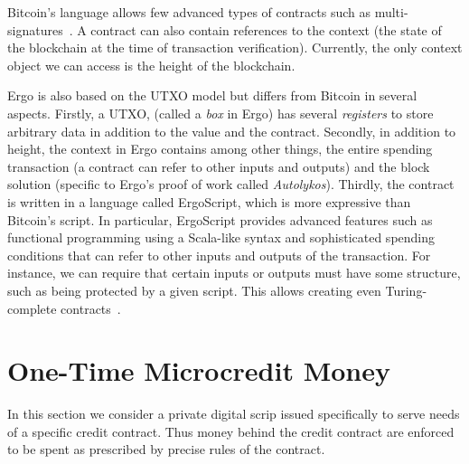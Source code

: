 \documentclass[]{llncs}   %
\newcommand{\authnote}[2]{\marginpar{\parbox{\marginparwidth}{\tiny %
  \textsf{#1 {\textcolor{blue}{notes: #2}}}}}%
  \textcolor{blue}{\textbf{\dag}}}
\newcommand{\authnote}[2]{
  \textsf{#1\textcolor{blue}{ #2}}}
\newcommand{\authnote}[2]{}
\newcommand{\knote}[1]{{\authnote{\textcolor{green}{Alex notes:}}{#1}}}
\begin{document}
Bitcoin's language allows few advanced types of contracts such as multi-signatures~\cite{multisig}. A contract can also contain references to the context (the state of the blockchain at the time of transaction verification). Currently, the only context object we can access is the height of the blockchain. 

Ergo is also based on the UTXO model but differs from Bitcoin in several aspects. Firstly, a UTXO, (called a {\em box} in Ergo) has several {\em registers} to store arbitrary data in addition to the value and the contract. Secondly, in addition to height, the context in Ergo contains among other things, the entire spending transaction (a contract can refer to other inputs and outputs) and the block solution (specific to Ergo's proof of work called {\em Autolykos}).
Thirdly, the contract is written in a language called ErgoScript, which is more expressive than Bitcoin's script. In particular, ErgoScript provides advanced features such as functional programming using a Scala-like syntax and sophisticated spending conditions that can refer to other inputs and outputs of the transaction. For instance, we can require that certain inputs or outputs must have some structure, such as being protected by a given script.
This allows creating even Turing-complete contracts~\cite{chepurnoy2018self}.





\knote{picture of }

\knote{Bitcoin script evaluates to true or false}

\knote{Context in Bitcoin and Ergo}

\knote{Support of complex signature schemes in Ergo}


\section{One-Time Microcredit Money}
\label{sec-microcredit}

 In this section we consider a private digital scrip issued specifically to serve needs of a specific credit contract. Thus money behind the credit contract are enforced to be spent as prescribed by precise rules of the contract.
\end{document}
